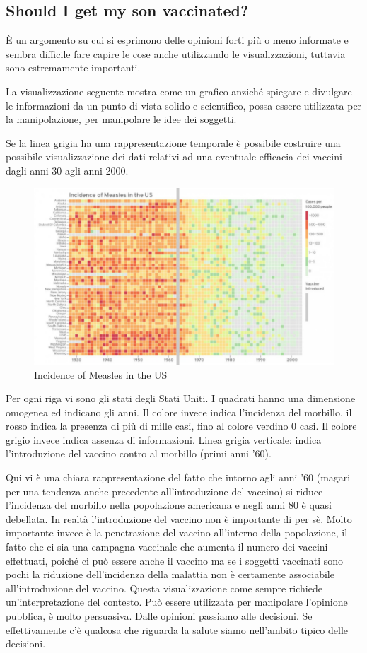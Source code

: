 \documentclass[12pt,a4paper]{report}
\begin{document}
\subsection{Should I get my son vaccinated?}

\`E un argomento su cui si esprimono delle opinioni forti più o meno informate e sembra difficile fare capire le cose anche utilizzando le visualizzazioni, tuttavia sono estremamente importanti. 

La visualizzazione seguente mostra come un grafico anziché spiegare e divulgare le informazioni da un punto di vista solido e scientifico, possa essere utilizzata per la manipolazione, per manipolare le idee dei soggetti. 

Se la linea grigia ha una rappresentazione temporale è possibile costruire una possibile visualizzazione dei dati relativi ad una eventuale efficacia dei vaccini dagli anni 30 agli anni 2000. 
\begin{figure}[h]
	\centering
	\includegraphics[width=0.7\linewidth]{imgs datavis/Vaccino.png}
	\caption{Incidence of Measles in the US}
	\label{fig:Measles}
\end{figure} 

Per ogni riga vi sono gli stati degli Stati Uniti. I quadrati hanno una dimensione omogenea ed indicano gli anni. Il colore invece indica l'incidenza del morbillo, il rosso indica la presenza di più di mille casi, fino al colore verdino 0 casi. Il colore grigio invece indica assenza di informazioni. Linea grigia verticale: indica l'introduzione del vaccino contro al morbillo (primi anni '60).

Qui vi è una chiara rappresentazione del fatto che intorno agli anni '60 (magari per una tendenza anche precedente all'introduzione del vaccino) si riduce l'incidenza del morbillo nella popolazione americana e negli anni 80 è quasi debellata. In realtà l'introduzione del vaccino non è importante di per sè. Molto importante invece è la penetrazione del vaccino all'interno della popolazione, il fatto che ci sia una campagna vaccinale che aumenta il numero dei vaccini effettuati, poiché ci può essere anche il vaccino ma se i soggetti vaccinati sono pochi la riduzione dell'incidenza della malattia non è certamente associabile all'introduzione del vaccino. Questa visualizzazione come sempre richiede un'interpretazione del contesto. Può essere utilizzata per manipolare l'opinione pubblica, è molto persuasiva. 
Dalle opinioni passiamo alle decisioni. Se effettivamente c'è qualcosa che riguarda la salute siamo nell'ambito tipico delle decisioni. 
\end{document}
